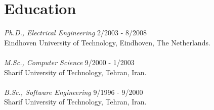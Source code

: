 \section{Education} 

{\sl Ph.D., Electrical Engineering} \hfill 2/2003 - 8/2008 \\
Eindhoven University of Technology, Eindhoven, The Netherlands. \\ \\
{\sl M.Sc., Computer Science} \hfill 9/2000 - 1/2003  \\
Sharif University of Technology, Tehran, Iran.\\  \\
{\sl B.Sc., Software Engineering} \hfill 9/1996 - 9/2000  \\
Sharif University of Technology, Tehran, Iran.

